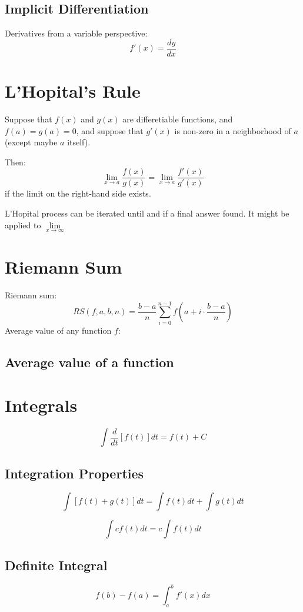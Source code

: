 \documentclass[12pt, a4paper]{scrartcl}
\begin{document}
\subsection{Implicit Differentiation}
\label{sec:application:impl_diff}
Derivatives from a variable perspective:
$$f'(x)=\dfrac{dy}{dx}$$

\section{L'Hopital's Rule}
\label{sec:lopital}
Suppose that $f(x)$ and $g(x)$ are differetiable functions, and $f(a) = g(a) = 0$, and suppose that $g'(x)$ is non-zero in a neighborhood of $a$ (except maybe $a$ itself).
\par
Then:
$$\lim_{x \to a} \dfrac{f(x)}{g(x)}=\lim_{x \to a}\dfrac{f'(x)}{g'(x)}$$ if the limit on the right-hand side exists.\par
L'Hopital process can be iterated until and if a final answer found. It might be applied to $\underset{x \to \infty}{\lim}$

\section{Riemann Sum}
\label{sec:riemann_sum}
Riemann sum:
    $$RS(f, a, b, n) = \frac{b - a}{n}\sum_{i=0}^{n - 1} f(a + i \cdot \frac{b - a}{n})$$
Average value of any function $f$:


\subsection{Average value of a function}
\label{sec:riemann_sum:avg}


\section{Integrals}
\label{sec:integrals}
$$\int \frac {d} {dt} [f(t)]dt = f(t) + C$$

\subsection{Integration Properties}
\label{sec:integrals:props}
$$\int [f(t) + g(t)]dt = \int f(t)dt + \int g(t)dt$$

$$\int c f(t) dt = c \int f(t) dt$$

\subsection{Definite Integral}
\label{sec:integrals:definite}
$$f(b) - f(a) = \int_{a}^{b} f'(x)dx$$
\end{document}

